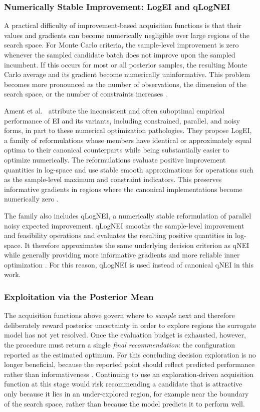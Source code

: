 \documentclass[12pt,a4paper]{report}
\begin{document}
        \subsubsection{Numerically Stable Improvement: LogEI and qLogNEI}
        A practical difficulty of improvement-based acquisition functions is that their values and gradients can become numerically negligible over large regions of the search space. For Monte Carlo criteria, the sample-level improvement is zero whenever the sampled candidate batch does not improve upon the sampled incumbent. If this occurs for most or all posterior samples, the resulting Monte Carlo average and its gradient become numerically uninformative. This problem becomes more pronounced as the number of observations, the dimension of the search space, or the number of constraints increases \cite{ament2023unexpected}.

        Ament et al.~\cite{ament2023unexpected} attribute the inconsistent and often suboptimal empirical performance of EI and its variants, including constrained, parallel, and noisy forms, in part to these numerical optimization pathologies. They propose LogEI, a family of reformulations whose members have identical or approximately equal optima to their canonical counterparts while being substantially easier to optimize numerically. The reformulations evaluate positive improvement quantities in log-space and use stable smooth approximations for operations such as the sample-level maximum and constraint indicators. This preserves informative gradients in regions where the canonical implementations become numerically zero \cite{ament2023unexpected}.

        The family also includes qLogNEI, a numerically stable reformulation of parallel noisy expected improvement. qLogNEI smooths the sample-level improvement and feasibility operations and evaluates the resulting positive quantities in log-space. It therefore approximates the same underlying decision criterion as qNEI while generally providing more informative gradients and more reliable inner optimization \cite{ament2023unexpected}. For this reason, qLogNEI is used instead of canonical qNEI in this work.

        \subsubsection{Exploitation via the Posterior Mean}
        The acquisition functions above govern where to \emph{sample} next and therefore deliberately reward posterior uncertainty in order to explore regions the surrogate model has not yet resolved. Once the evaluation budget is exhausted, however, the procedure must return a single \emph{final recommendation}: the configuration reported as the estimated optimum. For this concluding decision exploration is no longer beneficial, because the reported point should reflect predicted performance rather than informativeness \cite{shahriari2015taking}. Continuing to use an exploration-driven acquisition function at this stage would risk recommending a candidate that is attractive only because it lies in an under-explored region, for example near the boundary of the search space, rather than because the model predicts it to perform well.
\end{document}
